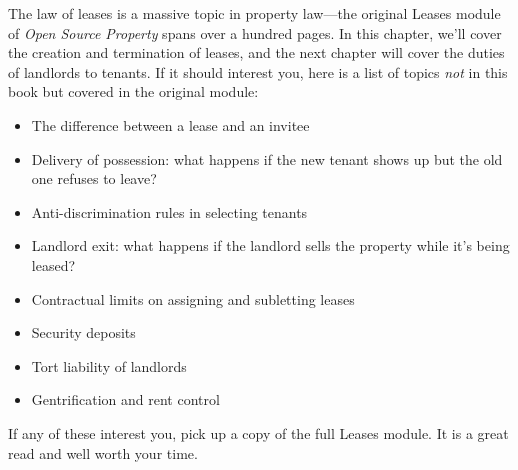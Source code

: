 The law of leases is a massive topic in property law---the original Leases
module of \emph{Open Source Property} spans over a hundred pages. In this
chapter, we'll cover the creation and termination of leases, and the next
chapter will cover the duties of landlords to tenants. If it should interest
you, here is a list of topics \emph{not} in this book but covered in the
original module:
\begin{itemize}
\item The difference between a lease and an invitee
\item Delivery of possession: what happens if the new tenant shows up but the
old one refuses to leave?
\item Anti-discrimination rules in selecting tenants
\item Landlord exit: what happens if the landlord sells the property while it's
being leased?
\item Contractual limits on assigning and subletting leases
\item Security deposits
\item Tort liability of landlords
\item Gentrification and rent control
\end{itemize}
If any of these interest you, pick up a copy of the full Leases module. It is a
great read and well worth your time.
